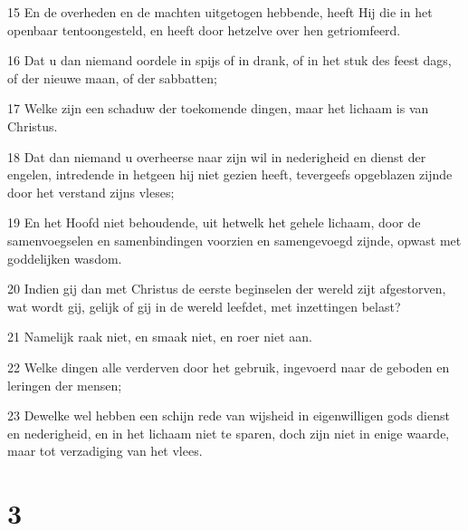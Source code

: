 \par 15 En de overheden en de machten uitgetogen hebbende, heeft Hij die in het openbaar tentoongesteld, en heeft door hetzelve over hen getriomfeerd.
\par 16 Dat u dan niemand oordele in spijs of in drank, of in het stuk des feest dags, of der nieuwe maan, of der sabbatten;
\par 17 Welke zijn een schaduw der toekomende dingen, maar het lichaam is van Christus.
\par 18 Dat dan niemand u overheerse naar zijn wil in nederigheid en dienst der engelen, intredende in hetgeen hij niet gezien heeft, tevergeefs opgeblazen zijnde door het verstand zijns vleses;
\par 19 En het Hoofd niet behoudende, uit hetwelk het gehele lichaam, door de samenvoegselen en samenbindingen voorzien en samengevoegd zijnde, opwast met goddelijken wasdom.
\par 20 Indien gij dan met Christus de eerste beginselen der wereld zijt afgestorven, wat wordt gij, gelijk of gij in de wereld leefdet, met inzettingen belast?
\par 21 Namelijk raak niet, en smaak niet, en roer niet aan.
\par 22 Welke dingen alle verderven door het gebruik, ingevoerd naar de geboden en leringen der mensen;
\par 23 Dewelke wel hebben een schijn rede van wijsheid in eigenwilligen gods dienst en nederigheid, en in het lichaam niet te sparen, doch zijn niet in enige waarde, maar tot verzadiging van het vlees.

\chapter{3}

